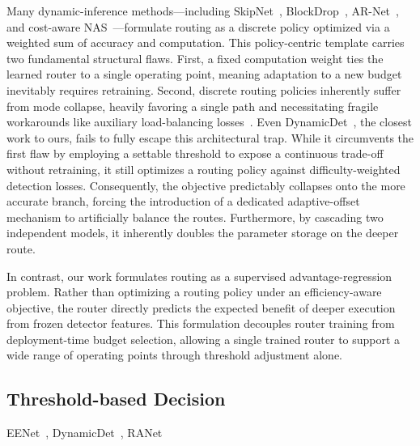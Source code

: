 Many dynamic-inference methods—including SkipNet~\cite{wang2018skipnet}, BlockDrop~\cite{wu2018blockdrop}, AR-Net~\cite{meng2020ar}, and cost-aware NAS~\cite{dai2020danas}—formulate routing as a discrete policy optimized via a weighted sum of accuracy and computation. This policy-centric template carries two fundamental structural flaws. 
First, a fixed computation weight ties the learned router to a single operating point, meaning adaptation to a new budget inevitably requires retraining. 
Second, discrete routing policies inherently suffer from mode collapse, heavily favoring a single path and necessitating fragile workarounds like auxiliary load-balancing losses~\cite{shazeer2017,fedus2022switch,riquelme2021scaling}.
Even DynamicDet~\cite{lin2023dynamicdet}, the closest work to ours, fails to fully escape this architectural trap. 
While it circumvents the first flaw by employing a settable threshold to expose a continuous trade-off without retraining, it still optimizes a routing policy against difficulty-weighted detection losses.
Consequently, the objective predictably collapses onto the more accurate branch, forcing the introduction of a dedicated adaptive-offset mechanism to artificially balance the routes. 
Furthermore, by cascading two independent models, it inherently doubles the parameter storage on the deeper route.

In contrast, our work formulates routing as a supervised advantage-regression
problem. Rather than optimizing a routing policy under an efficiency-aware
objective, the router directly predicts the expected benefit of deeper
execution from frozen detector features. This formulation decouples router
training from deployment-time budget selection, allowing a single trained
router to support a wide range of operating points through threshold
adjustment alone.

\subsection{Threshold-based Decision}

EENet~\cite{ilhan2024eenet}, 
DynamicDet~\cite{lin2023dynamicdet}, 
RANet~\cite{yang2020ranet}